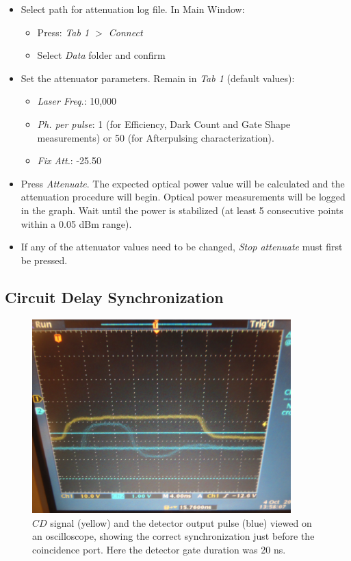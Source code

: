 \documentclass{article}
\begin{document}
\begin{itemize}

\item
Select path for attenuation log file. In Main Window:
\begin{itemize}
\item
Press: \emph{Tab 1 $>$ Connect}
\item 
Select \emph{Data} folder and confirm
\end{itemize}

\label{sec:soft_init}

\item
Set the attenuator parameters. Remain in \emph{Tab 1} (default values):
\begin{itemize}
\item
\emph{Laser Freq.}: 10,000
\item
\emph{Ph. per pulse}: 1 (for Efficiency, Dark Count and Gate Shape measurements) or 50 (for Afterpulsing characterization). 
\item
\emph{Fix Att.}: -25.50
\end{itemize}
\item
Press \emph{Attenuate}. The expected optical power value will be calculated and the attenuation procedure will begin. Optical power measurements will be logged in the graph. Wait until the power is stabilized (at least 5 consecutive points within a 0.05 dBm range).
\item
If any of the attenuator values need to be changed, \emph{Stop attenuate} must first be pressed. 

\end{itemize}

\subsection{Circuit Delay Synchronization}

\begin{figure}
\centering
\includegraphics[width=10cm]{images/trace.JPG}
\caption{$CD$ signal (yellow) and the detector output pulse (blue) viewed on an oscilloscope, showing the correct synchronization just before the coincidence port. Here the detector gate duration was 20 ns.}
\label{trace}
\end{figure}
\end{document}
